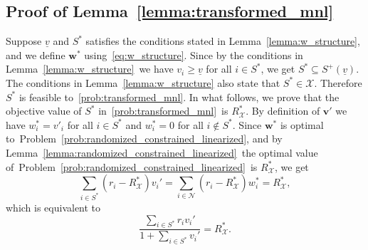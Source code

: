 \documentclass[mnsc,non-blindrev]{informs3}
\theoremstyle{definition}
\begin{document}
\begin{appendices}{\Large{}}
\subsection{Proof of Lemma~\ref{lemma:transformed_mnl}}\label{sec:lemma:transformed_mnl}

Suppose $\underline{v}$ and $S^*$ satisfies the conditions stated in Lemma~\ref{lemma:w_structure}, and we define $\bm{w}^*$ using~\eqref{eq:w_structure}. Since by the conditions in Lemma~\ref{lemma:w_structure}~we have $v_i\geq \underline{v}$ for all $i\in S^*$, we get $S^*\subseteq S^+(\underline{v})$. The conditions in Lemma~\ref{lemma:w_structure} also state that $S^*\in\mathcal{X}$. Therefore $S^*$ is feasible to~\ref{prob:transformed_mnl}. In what follows, we prove that the objective value of $S^*$ in~\ref{prob:transformed_mnl}~is $R^*_{\mathcal{X}}$. By definition of $\bm{v}'$ we have $w_i^*=v'_i$ for all $i\in S^*$ and $w_i^*=0$ for all $i\notin S^*$. Since $\bm{w}^*$ is optimal to~Problem~\eqref{prob:randomized_constrained_linearized}, and by Lemma~\ref{lemma:randomized_constrained_linearized}~the optimal value of~Problem~\eqref{prob:randomized_constrained_linearized}~is $R^*_{\mathcal{X}}$, we get
\begin{equation*}
\sum_{i\in S^*}(r_i-R_{\mathcal{X}}^*)v_i'=\sum_{i\in\mathcal{N}}(r_i-R_{\mathcal{X}}^*)w_i^*=R_{\mathcal{X}}^*,
\end{equation*}
which is equivalent to
\begin{equation*}
\dfrac{\sum_{i\in S^*}r_iv_i'}{1+\sum_{i\in S^*}v_i'}=R_{\mathcal{X}}^*.
\end{equation*}


\end{appendices}
\end{document}
